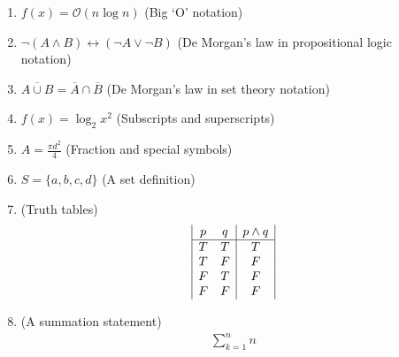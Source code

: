 \documentclass[11pt]{article} %
\begin{document}
	\begin{enumerate} %
		\item $f(x) = \mathcal{O}(n \log n)$ (Big `O' notation)	%
		\item $\neg(A \land B) \leftrightarrow (\neg A \lor \neg B)$ (De Morgan's law in propositional logic notation) %
		\item $\overline{A \cup B} = \overline{A} \cap \overline{B}$ (De Morgan's law in set theory notation)
		\item $f(x) = \log_{2} x^{2}$ (Subscripts and superscripts) %
		\item $A = \frac{\pi d^2}{4}$ (Fraction and special symbols)
		\item $S = \{a, b, c, d\}$ (A set definition)
		\item (Truth tables) 
		\begin{align*}  %
			\begin{array}{|c c|c|} %
			p & q & p \land q\\ %
			\hline %
			T & T & T\\
			T & F & F\\
			F & T & F\\
			F & F & F\\
			\end{array}
		\end{align*}
		\item (A summation statement)
		\begin{align*}
			\sum_{k=1}^{n}n 
		\end{align*}
		
	\end{enumerate}
\end{document}
